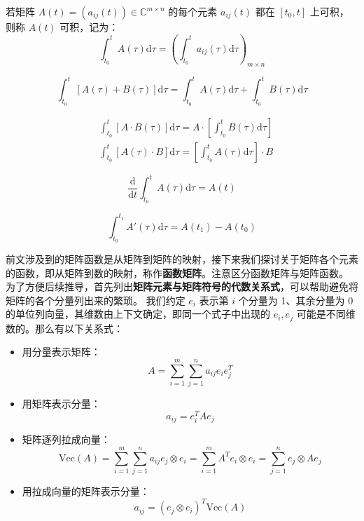 \begin{definition}[矩阵的积分]
若矩阵 $A(t)=(a_{ij}(t))\in\mathbb C^{m\times n}$ 的每个元素 $a_{ij}(t)$ 都在 $[t_0,t]$ 上可积，则称 $A(t)$ 可积，记为：
\[
    \int_{t_0}^t A(\tau)\mathrm d\tau=\left(\int_{t_0}^ta_{ij}(\tau)\mathrm d\tau\right)_{m\times n}
\]
\end{definition}
\begin{property}
\[
    \int_{t_0}^t[A(\tau)+B(\tau)]\mathrm d\tau=\int_{t_0}^tA(\tau)\mathrm d\tau+\int_{t_0}^tB(\tau)\mathrm d\tau
\]
\end{property}
\begin{property}
\begin{align*}
    &\int_{t_0}^t[A\cdot B(\tau)]\mathrm d\tau=A\cdot\left[\int_{t_0}^tB(\tau)\mathrm d\tau\right]\\
    &\int_{t_0}^t[A(\tau)\cdot B]\mathrm d\tau=\left[\int_{t_0}^tA(\tau)\mathrm d\tau\right]\cdot B
\end{align*}
\end{property}
\begin{property}
\[
    \frac{\mathrm d}{\mathrm dt}\int_{t_0}^tA(\tau)\mathrm d\tau=A(t)
\]
\end{property}
\begin{property}
\[
    \int_{t_0}^{t_1}A'(\tau)\mathrm d\tau=A(t_1)-A(t_0)
\]
\end{property}

\vskip 6pt

前文涉及到的矩阵函数是从矩阵到矩阵的映射，接下来我们探讨关于矩阵各个元素的函数，即从矩阵到数的映射，称作\textbf{函数矩阵}。注意区分函数矩阵与矩阵函数。
为了方便后续推导，首先列出\textbf{矩阵元素与矩阵符号的代数关系式}，可以帮助避免将矩阵的各个分量列出来的繁琐。
我们约定 $e_i$ 表示第 $i$ 个分量为 1、其余分量为 0 的单位列向量，其维数由上下文确定，即同一个式子中出现的 $e_i,e_j$ 可能是不同维数的。那么有以下关系式：

\begin{itemize}
    \item 用分量表示矩阵：
    \[
        A=\sum_{i=1}^m\sum_{j=1}^na_{ij}e_ie_j^T
    \]

    \item 用矩阵表示分量：
    \[
        a_{ij}=e_i^TAe_j
    \]

    \item 矩阵逐列拉成向量：
    \[
        \text{Vec}(A)=\sum_{i=1}^m\sum_{j=1}^na_{ij}e_j\otimes e_i=\sum_{i=1}^mA^T e_i\otimes e_i=\sum_{j=1}^ne_j\otimes Ae_j
    \]

    \item 用拉成向量的矩阵表示分量：
    \[
        a_{ij}=(e_j\otimes e_i)^T\text{Vec}(A)
    \]
\end{itemize}

